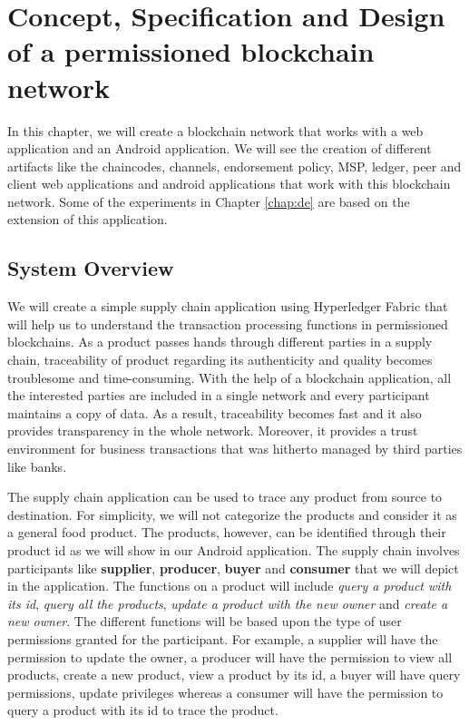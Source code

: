 \documentclass[
  a4paper,  %
  twoside,  %
  bibliography=totoc,
  headsepline,
  cleardoublepage=empty,
  parskip=half,
  draft=false
]{scrbook}
\begin{document}
\chapter{Concept, Specification and Design of a permissioned blockchain network}
\label{chap:cs}
In this chapter, we will create a blockchain network that works with a web application and an Android application. We will see the creation of different artifacts like the chaincodes, channels, endorsement policy, MSP, ledger, peer and client web applications and android applications that work with this blockchain network. Some of the experiments in Chapter \ref{chap:de} are based on the extension of this application. 

\section{System Overview}
We will create a simple supply chain application using Hyperledger Fabric that will help us to understand the transaction processing functions in permissioned blockchains. As a product passes hands through different parties in a supply chain, traceability of product regarding its authenticity and quality becomes troublesome and time-consuming. With the help of a blockchain application, all the interested parties are included in a single network and every participant maintains a copy of data. As a result, traceability becomes fast and it also provides transparency in the whole network. Moreover, it provides a trust environment for business transactions that was hitherto managed by third parties like banks.

The supply chain application can be used to trace any product from source to destination. For simplicity, we will not categorize the products and consider it as a general food product. The products, however, can be identified through their product id as we will show in our Android application. The supply chain involves participants like \textbf{supplier}, \textbf{producer}, \textbf{buyer} and \textbf{consumer} that we will depict in the application. The functions on a product will include \textit{query a product with its id}, \textit{query all the products}, \textit{update a product with the new owner} and \textit{create a new owner}. The different functions will be based upon the type of user permissions granted for the participant. For example, a supplier will have the permission to update the owner, a producer will have the permission to view all products, create a new product, view a product by its id, a buyer will have query permissions, update privileges whereas a consumer will have the permission to query a product with its id to trace the product.
\end{document}
